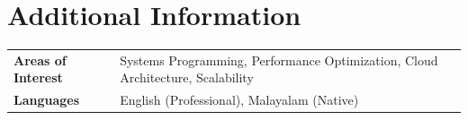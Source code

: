 \documentclass[10pt, a4paper]{article}
\begin{document}
\section*{Additional Information}

\begin{tabular}{@{} >{\bfseries}p{3.8cm} p{13cm} @{}}
Areas of Interest & Systems Programming, Performance Optimization, Cloud Architecture, Scalability \\
Languages         & English (Professional), Malayalam (Native) \\
\end{tabular}
\end{document}

